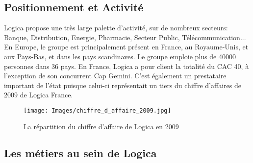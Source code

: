 \subsection{Positionnement et Activité}

Logica propose une très large palette d'activité, sur de nombreux secteurs: Banque, Distribution, Energie, Pharmacie, Secteur Public, Télécommunication... En Europe, le groupe est principalement présent en France, au Royaume-Unis, et aux Pays-Bas, et dans les pays scandinaves. Le groupe emploie plus de 40000 personnes dans 36 pays. En France, Logica a pour client la totalité du CAC 40, à l'exception de son concurrent Cap Gemini. C'est également un prestataire important de l'état puisque celui-ci représentait un tiers du chiffre d'affaires de 2009 de Logica France.  
\begin{figure}[h]
  \begin{center}
    \texttt{[image: Images/chiffre\_d\_affaire\_2009.jpg]}
  \end{center}
  \caption{La répartition du chiffre d'affaire de Logica en 2009}
  \label{La répartition du chiffre d'affaire de Logica en 2009}
\end{figure}
\subsection{Les métiers au sein de Logica}

